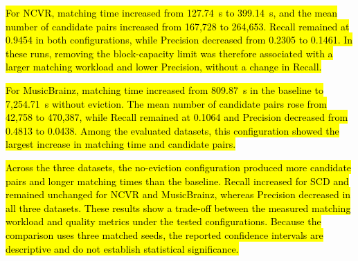 \documentclass{ieeeaccess}
\begin{document}
\hl{For NCVR, matching time increased from 127.74~s to 399.14~s, and the mean number of candidate pairs increased from 167,728 to 264,653. Recall remained at 0.9454 in both configurations, while Precision decreased from 0.2305 to 0.1461. In these runs, removing the block-capacity limit was therefore associated with a larger matching workload and lower Precision, without a change in Recall.}

\hl{For MusicBrainz, matching time increased from 809.87~s in the baseline to 7,254.71~s without eviction. The mean number of candidate pairs rose from 42,758 to 470,387, while Recall remained at 0.1064 and Precision decreased from 0.4813 to 0.0438. Among the evaluated datasets, this configuration showed the largest increase in matching time and candidate pairs.}

\hl{Across the three datasets, the no-eviction configuration produced more candidate pairs and longer matching times than the baseline. Recall increased for SCD and remained unchanged for NCVR and MusicBrainz, whereas Precision decreased in all three datasets. These results show a trade-off between the measured matching workload and quality metrics under the tested configurations. Because the comparison uses three matched seeds, the reported confidence intervals are descriptive and do not establish statistical significance.}
\end{document}
